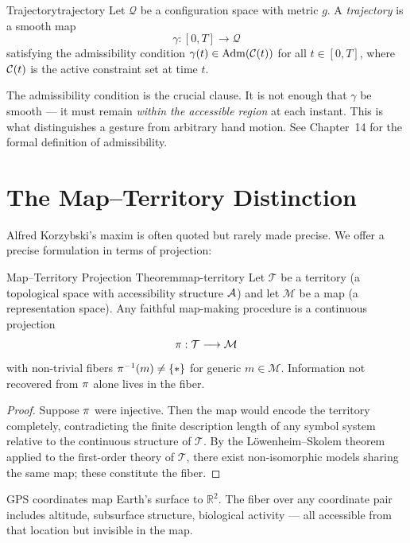 \begin{definition}{Trajectory}{trajectory}
  Let $\mathcal{Q}$ be a configuration space with metric $g$. A
  \emph{trajectory} is a smooth map
  \[
    \gamma : [0, T] \longrightarrow \mathcal{Q}
  \]
  satisfying the admissibility condition $\gamma(t) \in \mathrm{Adm}(\mathcal{C}(t))$
  for all $t \in [0,T]$, where $\mathcal{C}(t)$ is the active constraint set
  at time $t$.
\end{definition}

\begin{remark}
  The admissibility condition is the crucial clause. It is not enough that
  $\gamma$ be smooth — it must remain \emph{within the accessible region} at
  each instant. This is what distinguishes a gesture from arbitrary hand
  motion. See Chapter~14 for the formal definition of admissibility.
\end{remark}

\section{The Map–Territory Distinction}

Alfred Korzybski's maxim is often quoted but rarely made precise. We offer
a precise formulation in terms of projection:

\begin{theorem}{Map–Territory Projection Theorem}{map-territory}
  Let $\mathcal{T}$ be a territory (a topological space with accessibility
  structure $\mathcal{A}$) and let $\mathcal{M}$ be a map (a representation space).
  Any faithful map-making procedure is a continuous projection
  \[
    \pi : \mathcal{T} \longrightarrow \mathcal{M}
  \]
  with non-trivial fibers $\pi^{-1}(m) \neq \{*\}$ for generic $m \in \mathcal{M}$.
  Information not recovered from $\pi$ alone lives in the fiber.
\end{theorem}

\begin{proof}
  Suppose $\pi$ were injective. Then the map would encode the territory
  completely, contradicting the finite description length of any symbol system
  relative to the continuous structure of $\mathcal{T}$. By the Löwenheim–Skolem
  theorem applied to the first-order theory of $\mathcal{T}$, there exist
  non-isomorphic models sharing the same map; these constitute the fiber.
\end{proof}

\begin{example}
  GPS coordinates map Earth's surface to $\mathbb{R}^2$. The fiber over any
  coordinate pair includes altitude, subsurface structure, biological activity —
  all accessible from that location but invisible in the map.
\end{example}

